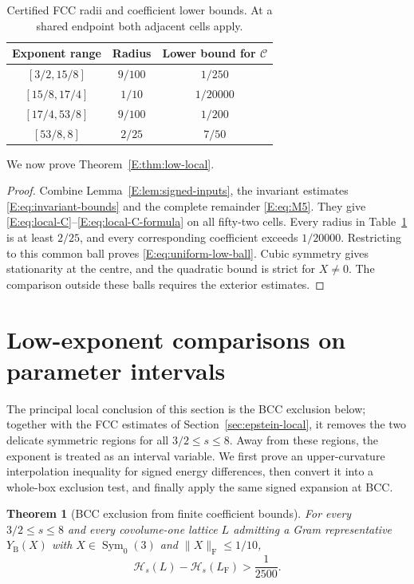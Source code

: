 \documentclass[reqno,english]{amsart}
\newtheorem{theorem}{Theorem}[section]
\theoremstyle{definition}
\newtheorem{open problem}[theorem]{Open Problem}
\theoremstyle{remark}
\theoremstyle{plain}
\numberwithin{equation}{section}
\newcommand{\FCC}{L_{\mathrm F}}
\newcommand{\HH}{\mathcal H}
\newcommand{\norm}[1]{\lVert#1\rVert_{\mathrm F}}
\newcommand{\Symzero}{\operatorname{Sym}_0(3)}
\begin{document}
\begin{table}[ht]\centering
\caption{Certified FCC radii and coefficient lower bounds. At a shared endpoint both adjacent cells apply.}\label{E:tab:low-local}
\begin{tabular}{ccc}\toprule
Exponent range&Radius&Lower bound for $\mathcal C$\\\midrule
$[3/2,15/8]$&$9/100$&$1/250$\\
$[15/8,17/4]$&$1/10$&$1/20000$\\
$[17/4,53/8]$&$9/100$&$1/200$\\
$[53/8,8]$&$2/25$&$7/50$\\\bottomrule
\end{tabular}
\end{table}

We now prove Theorem~\ref{E:thm:low-local}.

\begin{proof}
Combine Lemma~\ref{E:lem:signed-inputs}, the invariant estimates
\eqref{E:eq:invariant-bounds} and the complete remainder
\eqref{E:eq:M5}. They give
\eqref{E:eq:local-C}--\eqref{E:eq:local-C-formula} on all
fifty-two cells. Every radius in Table~\ref{E:tab:low-local} is
at least $2/25$, and every corresponding coefficient exceeds
$1/20000$. Restricting to this common ball proves
\eqref{E:eq:uniform-low-ball}. Cubic symmetry gives stationarity
at the centre, and the quadratic bound is strict for $X\ne0$.
The comparison outside these balls requires the exterior estimates.
\end{proof}

\section{Low-exponent comparisons on parameter intervals}\label{sec:epstein-low-comparisons}

The principal local conclusion of this section is the BCC exclusion below; together with the FCC estimates of Section~\ref{sec:epstein-local}, it removes the two delicate symmetric regions for all $3/2\le s\le8$. Away from these regions, the exponent is treated as an interval variable. We first prove an upper-curvature interpolation inequality for signed energy differences, then convert it into a whole-box exclusion test, and finally apply the same signed expansion at BCC.

\begin{theorem}[BCC exclusion from finite coefficient bounds]\label{E:thm:bcc-ball}
For every $3/2\le s\le8$ and every covolume-one lattice $L$
admitting a Gram representative $Y_{\mathrm B}(X)$ with
$X\in\Symzero$ and $\norm X\le1/10$,
\begin{equation}\label{E:eq:BCC-neighborhood}
 \HH_s(L)-\HH_s(\FCC)>\frac1{2500}.
\end{equation}

\end{theorem}
\end{document}
